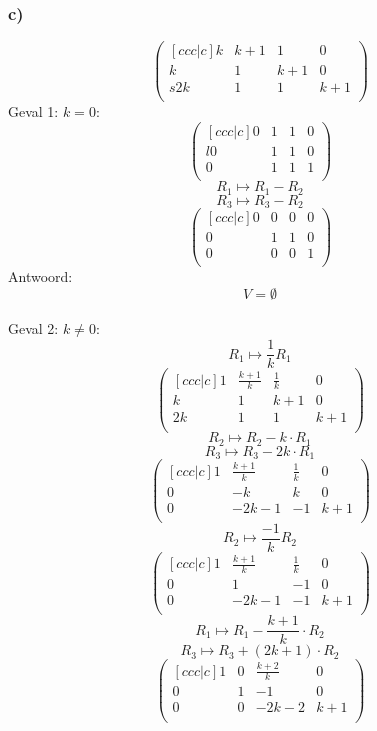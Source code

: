 \documentclass[lineaire_algebra_oplossingen.tex]{subfiles}
\begin{document}
\subsubsection*{c)}
\[
\begin{pmatrix}[ccc|c]
k & k+1 & 1 & 0\\
k & 1 & k+1 & 0\\s
2k & 1 & 1 & k+1\\
\end{pmatrix}
\]
Geval 1: $k=0$:
\[
\begin{pmatrix}[ccc|c]
0 & 1 & 1 & 0\\l
0 & 1 & 1 & 0\\
0 & 1 & 1 & 1\\
\end{pmatrix}
\]
\[ R_1 \longmapsto R_1 - R_2 \]
\[ R_3 \longmapsto R_3 - R_2 \]
\[
\begin{pmatrix}[ccc|c]
0 & 0 & 0 & 0\\
0 & 1 & 1 & 0\\
0 & 0 & 0 & 1\\
\end{pmatrix}
\]
Antwoord:
\[
V=\emptyset
\]\\
Geval 2: $k\neq0$:
\[ R_1 \longmapsto \frac{1}{k}R_1 \]
\[
\begin{pmatrix}[ccc|c]
1 & \frac{k+1}{k} & \frac{1}{k} & 0\\
k & 1 & k+1 & 0\\
2k & 1 & 1 & k+1\\
\end{pmatrix}
\]
\[ R_2 \longmapsto R_2 - k\cdot R_1 \]
\[ R_3 \longmapsto R_3 - 2k\cdot R_1 \]
\[
\begin{pmatrix}[ccc|c]
1 & \frac{k+1}{k} & \frac{1}{k} & 0\\
0 & -k & k & 0\\
0 & -2k-1 & -1 & k+1\\
\end{pmatrix}
\]
\[ R_2 \longmapsto \frac{-1}{k}R_2\]
\[
\begin{pmatrix}[ccc|c]
1 & \frac{k+1}{k} & \frac{1}{k} & 0\\
0 & 1 & -1 & 0\\
0 & -2k-1 & -1 & k+1\\
\end{pmatrix}
\]
\[ R_1 \longmapsto R_1 - \frac{k+1}{k}\cdot R_2 \]
\[ R_3 \longmapsto R_3 + (2k+1)\cdot R_2 \]
\[
\begin{pmatrix}[ccc|c]
1 & 0 & \frac{k+2}{k} & 0\\
0 & 1 & -1 & 0\\
0 & 0 & -2k-2 & k+1\\
\end{pmatrix}
\]
\end{document}
